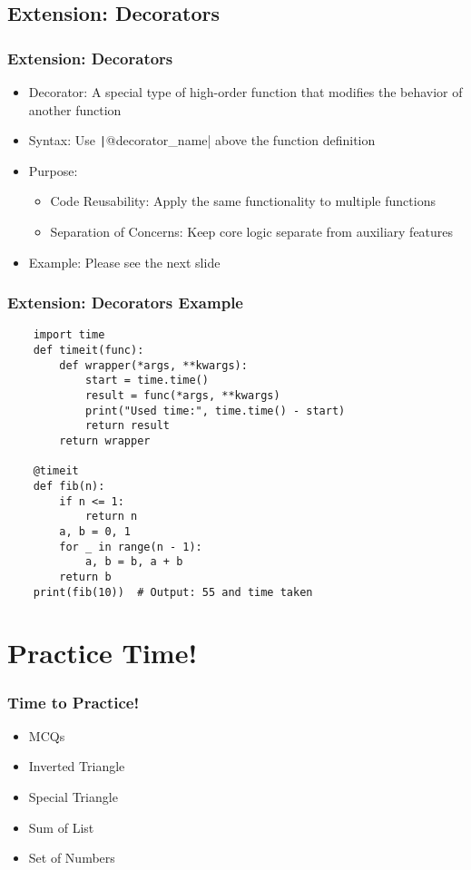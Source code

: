 \documentclass{beamer}
\newcommand{\python}[1]{\texttt|#1|}
\begin{document}
\subsection{Extension: Decorators}
\begin{frame}[fragile]
    \frametitle{Extension: Decorators}
    \begin{itemize}
        \item Decorator: A special type of high-order function that modifies the behavior of another function
        \item Syntax: Use \python{@decorator_name} above the function definition
        \item Purpose:
              \begin{itemize}
                  \item Code Reusability: Apply the same functionality to multiple functions
                  \item Separation of Concerns: Keep core logic separate from auxiliary features
              \end{itemize}
        \item Example: Please see the next slide
    \end{itemize}
\end{frame}
\begin{frame}[fragile]
    \frametitle{Extension: Decorators Example}
    \small
    \begin{verbatim}
    import time
    def timeit(func):
        def wrapper(*args, **kwargs):
            start = time.time()
            result = func(*args, **kwargs)
            print("Used time:", time.time() - start)
            return result
        return wrapper
    
    @timeit
    def fib(n):
        if n <= 1:
            return n
        a, b = 0, 1
        for _ in range(n - 1):
            a, b = b, a + b
        return b
    print(fib(10))  # Output: 55 and time taken
    \end{verbatim}
\end{frame}

\section{Practice Time!}
\begin{frame}
    \frametitle{Time to Practice!}
    \begin{itemize}
        \item MCQs
        \item Inverted Triangle
        \item Special Triangle
        \item Sum of List
        \item Set of Numbers
    \end{itemize}
\end{frame}
\end{document}
